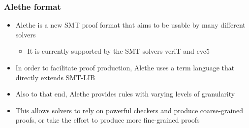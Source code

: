 \documentclass[usepdftitle=false,aspectratio=169]{beamer}
\newcommand\vitem{\vfill\item}
\begin{document}
\begin{frame}
  \frametitle{Alethe format}
  \begin{itemize}
    \item Alethe is a new SMT proof format that aims to be usable by many
    different solvers
    \begin{itemize}
      \item It is currently supported by the SMT solvers veriT and cvc5
    \end{itemize}
    \vitem In order to facilitate proof production, Alethe uses a term language
    that directly extends SMT-LIB
    \vitem Also to that end, Alethe provides rules with varying levels of
    granularity
    \vitem This allows solvers to rely on powerful checkers and produce
    coarse-grained proofs, or take the effort to produce more fine-grained
    proofs
  \end{itemize}
\end{frame}
\end{document}
